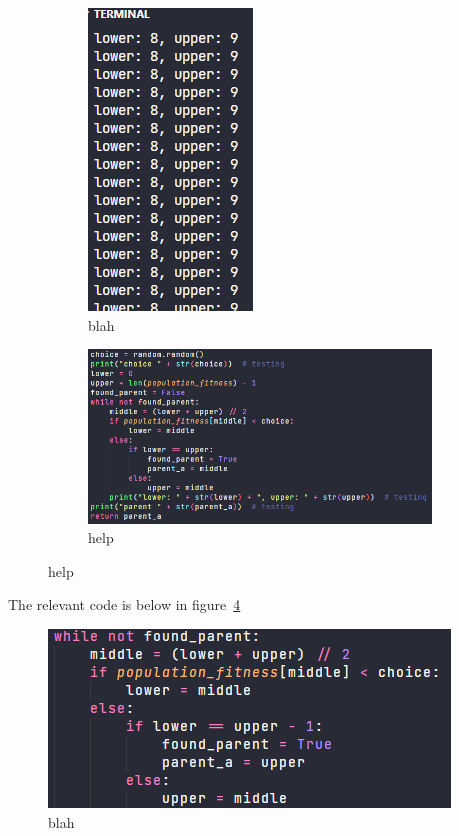\documentclass[a4paper, 12pt]{report}
\begin{document}
\begin{figure}[ht]
	\centering
	\begin{subfigure}{0.2\textwidth}
	\includegraphics[scale=0.5]{images/binary-search-2}
	\caption{blah} %
	\label{fig:terminal-output-1}
	\end{subfigure}
	\begin{subfigure}{0.7\textwidth}
	\includegraphics[scale=0.7]{images/binary-search-1}
	\caption{help} %
	\label{fig:code-1}
	\end{subfigure}
\end{figure}  %

The relevant code is below in figure~\ref*{fig:code-2}

\begin{figure}[ht]
	\centering
	\includegraphics{images/binary-search-3}
	\caption{blah}  %
	\label{fig:code-2}
\end{figure}
\end{document}
